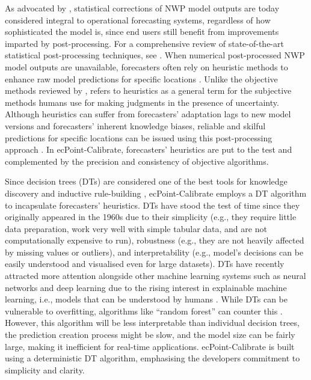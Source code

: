 \documentclass[techmemo]{ecmwfrep}%
\begin{document}
As advocated by \cite{Hemri2014}, statistical corrections of NWP model outputs are today considered integral to operational forecasting systems, regardless of how sophisticated the model is, since end users still benefit from improvements imparted by post-processing. For a comprehensive review of state-of-the-art statistical post-processing techniques, see \cite{Vannitsem2021}. When numerical post-processed NWP model outputs are unavailable, forecasters often rely on heuristic methods to enhance raw model predictions for specific locations \citep{Doswell2004}. Unlike the objective methods reviewed by \cite{Vannitsem2021}, \cite{Doswell2004} refers to heuristics as a general term for the subjective methods humans use for making judgments in the presence of uncertainty. Although heuristics can suffer from forecasters’ adaptation lags to new model versions and forecasters’ inherent knowledge biases, reliable and skilful predictions for specific locations can be issued using this post-processing approach \citep{Hoffman2017}. In ecPoint-Calibrate, forecasters’ heuristics are put to the test and complemented by the precision and consistency of objective algorithms.

Since decision trees (DTs) are considered one of the best tools for knowledge discovery and inductive rule-building \citep{Murthy1998, Rokach2014, Kotsiantis2013, Loh2014, Chase2022, Costa2023}, ecPoint-Calibrate employs a DT algorithm to incapsulate forecasters’ heuristics. DTs have stood the test of time since they originally appeared in the 1960s \citep{Morgan1963} due to their simplicity (e.g., they require little data preparation, work very well with simple tabular data, and are not computationally expensive to run), robustness (e.g., they are not heavily affected by missing values or outliers), and interpretability (e.g., model’s decisions can be easily understood and visualised even for large datasets). DTs have recently attracted more attention alongside other machine learning systems such as neural networks and deep learning \citep{Chase2023} due to the rising interest in explainable machine learning, i.e., models that can be understood by humans \citep{Rudin2019,Roscher2020}. While DTs can be vulnerable to overfitting, algorithms like “random forest” can counter this \citep{Abdulkareem2021}. However, this algorithm will be less interpretable than individual decision trees, the prediction creation process might be slow, and the model size can be fairly large, making it inefficient for real-time applications. ecPoint-Calibrate is built using a deterministic DT algorithm, emphasising the developers commitment to simplicity and clarity.
\end{document}
